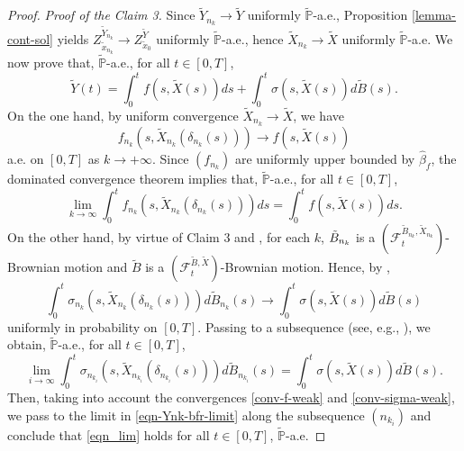 \documentclass[preprint,12pt]{elsarticle}
\newcounter{count}
\theoremstyle{plain}
\theoremstyle{definition}
\theoremstyle{remark}
\begin{document}
\begin{proof}
\emph{Proof of the Claim 3.} Since $\tilde{Y}_{n_k}\to \tilde{Y}$ uniformly $\tilde{\mathbb{P}}$-a.e., Proposition \ref{lemma-cont-sol} yields  $Z^{\tilde{Y}_{n_k}}_{\tilde{x}_{n_k}}\to Z^{\tilde{Y}}_{\tilde{x}_0}$ uniformly $\tilde{\mathbb{P}}$-a.e., hence $\tilde{X}_{n_k}\to \tilde{X}$ uniformly $\tilde{\mathbb{P}}$-a.e. We now prove that,  $\tilde{\mathbb{P}}$-a.e., for all $t\in [0,T]$,
		\begin{equation}\label{eqn_lim}
			\tilde{Y}(t) = \int_{0}^t f(s,\tilde{X}(s))ds + \int_{0}^t \sigma(s,\tilde{X}(s))d\tilde{B}(s).
		\end{equation}
On the one hand, by uniform convergence $\tilde{X}_{n_k}\to \tilde{X}$, we have $$f_{n_k}(s,\tilde{X}_{n_k}(\delta_{n_k}(s)))\to f(s,\tilde{X}(s))$$ a.e. on $[0,T]$ as $k\to+\infty$. Since $(f_{n_k})$ are uniformly upper bounded by $\hat\beta_f$, the dominated convergence theorem implies that, $\tilde{\mathbb{P}}$-a.e., for all $t\in [0,T]$, 
		\begin{equation}\label{conv-f-weak}
			\lim_{k\to \infty}\int_{0}^t f_{n_k}(s,\tilde{X}_{n_k}(\delta_{n_k}(s)))ds =  \int_0^t f(s,\tilde{X}(s))ds.
		\end{equation}
        On the other hand, by virtue of Claim 3 and \cite[Corollary 1.96]{MR3308895}, for each $k$, $\Tilde{B}_{n_k}$ is a $(\mathcal{F}^{\tilde{B}_{n_k},\tilde{X}_{n_k}}_t)$-Brownian motion and $\tilde{B}$ is a $(\mathcal{F}^{\tilde{B},\tilde{X}}_t)$-Brownian motion. Hence, by \cite[Proposition 2.15]{MR3308895}, 
		\begin{equation*}
			\int_{0}^{t}\sigma_{n_k}(s,\tilde{X}_{n_k}(\delta_{n_k}(s)))d\tilde{B}_{n_k}(s)\to \int_{0}^{t}\sigma(s,\tilde{X}(s))d\tilde{B}(s)
		\end{equation*}
		uniformly in probability on $[0,T]$. Passing to a subsequence (see, e.g., \cite[Theorem 9.2.1]{MR1932358}), we obtain,  $\tilde{\mathbb{P}}$-a.e., for all $t\in [0,T]$,
        \begin{equation}\label{conv-sigma-weak}
            \lim_{i\to \infty}\int_{0}^{t}\sigma_{n_{k_i}}(s,\tilde{X}_{n_{k_i}}(\delta_{n_{k_i}}(s)))d\tilde{B}_{n_{k_i}}(s)= \int_{0}^{t}\sigma(s,\tilde{X}(s))d\tilde{B}(s).
        \end{equation}
         Then, taking into account the convergences \eqref{conv-f-weak} and \eqref{conv-sigma-weak}, we pass to the limit in \eqref{eqn-Ynk-bfr-limit} along the subsequence $(n_{k_i})$ and conclude that \eqref{eqn_lim} holds for all $t\in [0,T]$,  $\tilde{\mathbb{P}}$-a.e.
	\end{proof}
    
\end{document}

